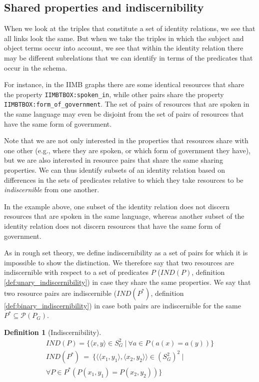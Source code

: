 \documentclass[letterpaper]{article}
\newtheorem{definition}{Definition}
\begin{document}
\subsection{Shared properties and indiscernibility}
\label{sec:indiscernibility}

When we look at the triples that constitute a set of identity relations, we see that all links look the same. But when we take the triples in which the subject and object terms occur into account, we see that within the identity relation there may be different subrelations that we can identify in terms of the predicates that occur in the schema.

For instance, in the IIMB graphs there are some identical resources that share the property \verb|IIMBTBOX:spoken_in|, while other pairs share the property \verb|IIMBTBOX:form_of_government|. The set of pairs of resources that are spoken in the same language may even be disjoint from the set of pairs of resources that have the same form of government.

Note that we are not only interested in the properties that resources share with one other (e.g., where they are spoken, or which form of government they have), but we are also interested in resource pairs that share the same sharing properties. We can thus identify subsets of an identity relation based on differences in the sets of predicates relative to which they take resources to be \emph{indiscernible} from one another.

In the example above, one subset of the identity relation does not discern resources that are spoken in the same language, whereas another subset of the identity relation does not discern resources that have the same form of government.

As in rough set theory, we define indiscernibility as a set of pairs for which it is impossible to show the distinction. We therefore say that two resources are indiscernible with respect to a set of predicates $P$ ($IND(P)$, definition \ref{def:unary_indiscernibility}) in case they share the same properties. We say that two resource pairs are indiscernible ($IND(P^*)$, definition \ref{def:binary_indiscernibility}) in case both pairs are indiscernible for the same $P^* \subseteq \mathcal{P}(P_G)$.

\begin{definition}[Indiscernibility]
\begin{align}
IND(P) = \{
  \langle x, y \rangle \in S_G^2
\  \vert \ 
  \forall a \in P(a(x) = a(y))
\}
\label{def:unary_indiscernibility}
\\
IND(P^*) \  = \  \{
    \langle
      \langle x_1, y_1 \rangle,
      \langle x_2, y_2 \rangle
    \rangle \in (S_G^2)^2
  \  \vert \ 
\nonumber
\\
    \forall P \in P^*(P(x_1, y_1) = P(x_2, y_2))
  \}
\label{def:binary_indiscernibility}
\end{align}
\end{definition}
\end{document}
